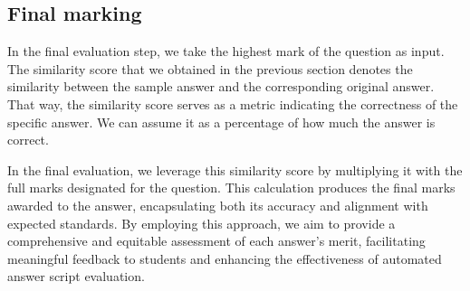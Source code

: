     \subsection{Final marking}
        \par
        In the final evaluation step, we take the highest mark of the question as input. The similarity score that we obtained in the previous section denotes the similarity between the sample answer and the corresponding original answer. That way, the similarity score serves as a metric indicating the correctness of the specific answer. We can assume it as a percentage of how much the answer is correct.
        \par
        In the final evaluation, we leverage this similarity score by multiplying it with the full marks designated for the question. This calculation produces the final marks awarded to the answer, encapsulating both its accuracy and alignment with expected standards. By employing this approach, we aim to provide a comprehensive and equitable assessment of each answer's merit, facilitating meaningful feedback to students and enhancing the effectiveness of automated answer script evaluation.
    
        
            




